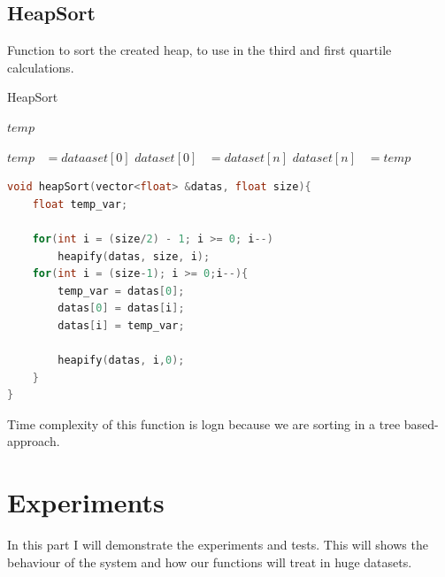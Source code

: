 \documentclass[a4paper, 12pt, titlepage]{article}
\begin{document}
\newpage

\subsection{HeapSort}

    Function to sort the created heap, to use in the third and first quartile calculations. 
\begin{algorithm}[H]
	\caption{HeapSort}
	\label{algo:dfs}
	\begin{algorithmic}


            \State $temp$\ {} 
            
                    \State{} 
            \EndFor
            
                    \State $ temp$  \ {$ = dataaset[0]$}
                    \State $ dataset[0]$  \ {$ = dataset[n]$}
                    \State $ dataset[n]$  \ {$ = temp$}
                    \State{}
            \EndFor     
            
	\EndFunction
	\end{algorithmic}
\end{algorithm}
    
\usepackage{\textbf{Code for HeapSort}}
\begin{lstlisting}[language=C++]
void heapSort(vector<float> &datas, float size){           
    float temp_var;

    for(int i = (size/2) - 1; i >= 0; i--)                  
        heapify(datas, size, i);
    for(int i = (size-1); i >= 0;i--){
        temp_var = datas[0];
        datas[0] = datas[i];
        datas[i] = temp_var;

        heapify(datas, i,0);
    }
}
\end{lstlisting}
Time complexity of this function is logn because we are sorting in a tree based-approach.

\newpage

\section{Experiments}
    In this part I will demonstrate the experiments and tests. This will shows the behaviour of the system and how our functions will treat in huge datasets.
\end{document}
